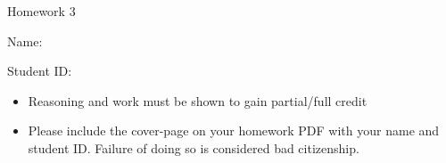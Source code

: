 \documentclass[11pt]{exam}
\begin{document}
\centerline{\Large \sc Homework 3}
\pagestyle{empty}

\hrulefill

\vspace{2cm}


{\Large \sc Name:}



\vspace{2cm}



{\Large \sc Student ID: }

\vspace{6cm}

\begin{itemize}
  \item Reasoning and work must be shown to gain partial/full
  credit
  \item Please include the cover-page on your homework PDF with your name and student ID. Failure of doing so is considered bad citizenship. 

 \end{itemize}

\clearpage
\end{document}
